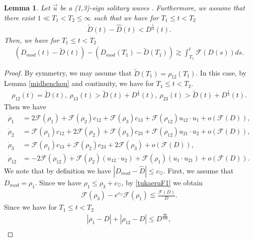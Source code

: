 \documentclass[10pt,a4paper]{amsart}
\newtheorem{lemma}{Lemma}
\begin{document}
\begin{lemma}\label{minhenchou}
Let $\vec{u}$ be a (1,3)-sign solitary waves . Furthermore, we assume that there exist $1\ll T_1< T_2\leq \infty$ such that we have for $T_1\leq t<T_2$
\begin{align}
\tilde{D}(t)-\hat{D}(t)<D^{\frac{1}{4}}(t). \label{lemass01253}
\end{align}
Then, we have for $T_1\leq t<T_2$
\begin{align}\label{Dmodes1}
\left(D_{mod}(t)-\tilde{D}(t)\right)-\left(D_{mod}(T_1)-\tilde{D}(T_1)\right)\gtrsim \int_{T_1}^t \mathcal{F}(D(s))ds.
\end{align}
\end{lemma}

\begin{proof}
By symmetry, we may assume that $\tilde{D}(T_1)=\rho_{12}(T_1)$.
In this case, by Lemma \ref{midhenchou} and continuity, we have for $T_1\leq t<T_2$.
\begin{align*}
\rho_{12}(t)=\tilde{D}(t),\ \rho_{13}(t)>\tilde{D}(t)+D^{\frac{1}{3}}(t),\ \rho_{23}(t)>\tilde{D}(t)+D^{\frac{1}{3}}(t).
\end{align*}
Then we have
\begin{align*}
\dot{\rho_1}&=2\mathcal{F}(\rho_1)+\mathcal{F}(\rho_2)c_{12}+\mathcal{F}(\rho_3)c_{13}+\mathcal{F}(\rho_{12})u_{12}\cdot u_1+o\left(\mathcal{F}(D)\right),
\\
\dot{\rho}_2&=\mathcal{F}(\rho_1)c_{12}+2\mathcal{F}(\rho_2)+\mathcal{F}(\rho_3)c_{23}+\mathcal{F}(\rho_{12})u_{21}\cdot u_2+o\left(\mathcal{F}(D)\right),
\\
\dot{\rho}_3&=\mathcal{F}(\rho_{1})c_{13}+\mathcal{F}(\rho_2)c_{23}+2\mathcal{F}(\rho_3)+o\left(\mathcal{F}(D)\right),
\\
\dot{\rho}_{12}&=-2\mathcal{F}(\rho_{12})+\mathcal{F}(\rho_2)(u_{12}\cdot u_2)+\mathcal{F}(\rho_1)(u_1\cdot u_{21})+o\left(\mathcal{F}(D)\right).
\end{align*}
We note that by definition we have $|D_{mod}-\hat{D}|\leq c_{\heartsuit}$.
First, we assume that $D_{mod}=\rho_1$.
Since we have $\rho_1\leq \rho_3+c_{\heartsuit}$, by \eqref{tukaeruF1} we obtain
\begin{align}\label{rho1rho3hyouka}
\mathcal{F}(\rho_3)-e^{c_{\heartsuit}}\mathcal{F}(\rho_1)\lesssim \frac{\mathcal{F}(D)}{D}.
\end{align}
Since we have for $T_1\leq t<T_2$
\begin{align*}
|\rho_1-D|+|\rho_{12}-D|\leq D^{\frac{99}{100}},
\\

\end{align*}
\end{proof}
\end{document}
